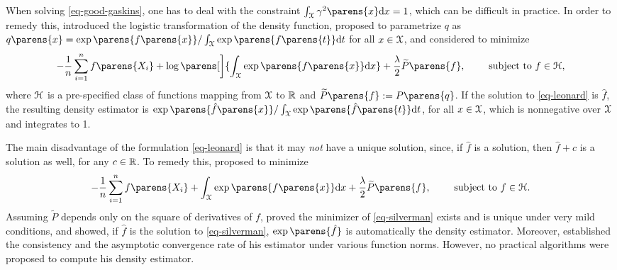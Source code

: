 When solving \eqref{eq-good-gaskins}, one has to deal with the constraint $\int_{\calX} \gamma^2 \parens{x} \diff x = 1$, which can be difficult in practice. In order to remedy this, \textcites{Leonard1978-mc} introduced the logistic transformation of the density function, proposed to parametrize $q$ as $q \parens{x} = \exp \parens{f \parens{x}} / \int_{\calX} \exp \parens{f \parens{t}} \diff t$ for all $x \in \mathcal{X}$, and considered to minimize 
\begin{align}\label{eq-leonard}
	- \frac{1}{n} \sum_{i=1}^n f \parens{X_i} + \log \parens[\bigg]{\int_{\calX} \exp\parens{f \parens{x}} \diff x} + \frac{\lambda}{2} \widetilde{P} \parens{f}, \qquad \text{ subject to } f \in \calH, 
\end{align}
where $\mathcal{H}$ is a pre-specified class of functions mapping from $\mathcal{X}$ to $\mathbb{R}$ and $\widetilde{P} \parens{f} := P \parens{q}$. If the solution to \eqref{eq-leonard} is $\hat{f}$, the resulting density estimator is $\exp \parens{\hat{f} \parens{x}} / \int_{\calX} \exp \parens{\hat{f} \parens{t}} \diff t$, for all $x \in \mathcal{X}$, which is nonnegative over $\mathcal{X}$ and integrates to 1. 

The main disadvantage of the formulation \eqref{eq-leonard} is that it may \textit{not} have a unique solution, since, if $\hat{f}$ is a solution, then $\hat{f} + c$ is a solution as well, for any $c \in \mathbb{R}$. To remedy this, \textcite{Silverman1982-ey} proposed to minimize 
\begin{align}\label{eq-silverman}
	- \frac{1}{n} \sum_{i=1}^n f \parens{X_i} + \int_{\calX} \exp \parens{f \parens{x}} \diff x + \frac{\lambda}{2} \widetilde{P} \parens{f}, \qquad \text{ subject to } f \in \calH. 
\end{align}
Assuming $\widetilde{P}$ depends only on the square of derivatives of $f$, \textcite{Silverman1982-ey} proved the minimizer of \eqref{eq-silverman} exists and is unique under very mild conditions, and showed, if $\hat{f}$ is the solution to \eqref{eq-silverman}, $\exp \parens{\hat{f}}$ is automatically the density estimator. Moreover, \textcite{Silverman1982-ey} established the consistency and the asymptotic convergence rate of his estimator under various function norms. However, no practical algorithms were proposed to compute his density estimator. 

